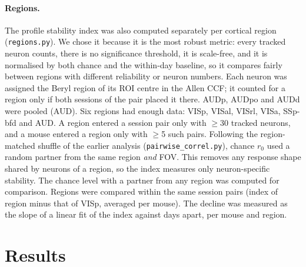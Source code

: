 \documentclass[10pt,a4paper]{article}
\begin{document}
\paragraph{Regions.}
The profile stability index was also computed separately per cortical region (\texttt{regions.py}). We chose it because it is the most robust metric: every tracked neuron counts, there is no significance threshold, it is scale-free, and it is normalised by both chance and the within-day baseline, so it compares fairly between regions with different reliability or neuron numbers.
Each neuron was assigned the Beryl region of its ROI centre in the Allen CCF; it counted for a region only if both sessions of the pair placed it there. AUDp, AUDpo and AUDd were pooled (AUD). Six regions had enough data: VISp, VISal, VISrl, VISa, SSp-bfd and AUD. A region entered a session pair only with $\geq$30 tracked neurons, and a mouse entered a region only with $\geq$5 such pairs.
Following the region-matched shuffle of the earlier analysis (\texttt{pairwise\_correl.py}), chance $r_0$ used a random partner from the same region \emph{and} FOV. This removes any response shape shared by neurons of a region, so the index measures only neuron-specific stability. The chance level with a partner from any region was computed for comparison.
Regions were compared within the same session pairs (index of region minus that of VISp, averaged per mouse). The decline was measured as the slope of a linear fit of the index against days apart, per mouse and region.

\section{Results}
\end{document}
